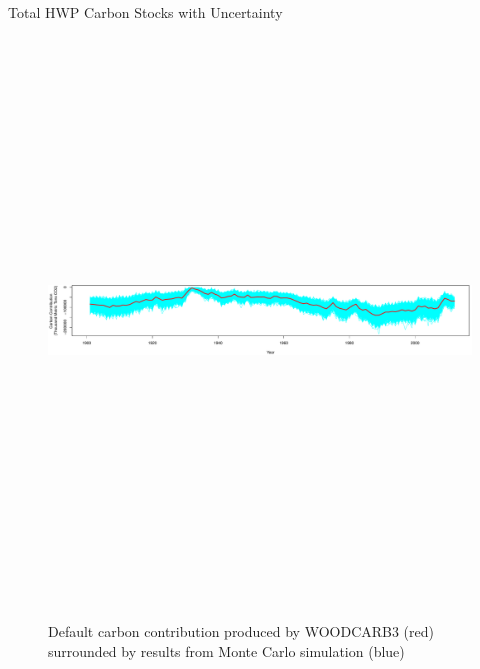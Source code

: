 \documentclass[final]{beamer}\usepackage[]{graphicx}\usepackage[]{color}
\newlength{\onecolwid}
\newlength{\twocolwid}
\begin{document}
\begin{frame}[t]
\begin{columns}[t]
\begin{column}{\twocolwid}
\begin{alertblock}{Total HWP Carbon Stocks with Uncertainty}
\begin{center}
\begin{figure}
    {\includegraphics[width=1\linewidth,height=15cm]{UncertaintyPlot.pdf}}
    \caption{Default carbon contribution produced by WOODCARB3 (red) surrounded by results from Monte Carlo simulation (blue)}
\end{figure}
\end{center}
\end{alertblock} 


\begin{columns}[t,totalwidth=\twocolwid] %

\begin{column}{\onecolwid} %



\end{column}
\end{columns}
\end{column}
\end{columns}
\end{frame}
\end{document}
